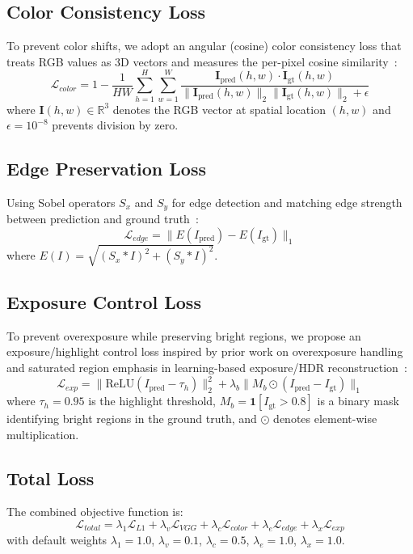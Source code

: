 \documentclass[conference]{IEEEtran}
\begin{document}
\subsection{Color Consistency Loss}
To prevent color shifts, we adopt an angular (cosine) color consistency loss that treats RGB values as 3D vectors and measures the per-pixel cosine similarity~\cite{park2023dualcolor}:
\begin{equation}
\mathcal{L}_{color} = 1 - \frac{1}{HW}\sum_{h=1}^{H}\sum_{w=1}^{W} 
\frac{\mathbf{I}_{\text{pred}}(h,w) \cdot \mathbf{I}_{\text{gt}}(h,w)}
{\|\mathbf{I}_{\text{pred}}(h,w)\|_2 \|\mathbf{I}_{\text{gt}}(h,w)\|_2 + \epsilon}
\end{equation}
where $\mathbf{I}(h,w) \in \mathbb{R}^3$ denotes the RGB vector at spatial 
location $(h,w)$ and $\epsilon=10^{-8}$ prevents division by zero.

\subsection{Edge Preservation Loss}
Using Sobel operators $S_x$ and $S_y$ for edge detection and matching edge strength between prediction and ground truth~\cite{edrnet2025edgematching}:
\begin{equation}
\mathcal{L}_{edge} = \|E(I_{\text{pred}}) - E(I_{\text{gt}})\|_1
\end{equation}
where $E(I) = \sqrt{(S_x * I)^2 + (S_y * I)^2}$.

\subsection{Exposure Control Loss}
To prevent overexposure while preserving bright regions, we propose an exposure/highlight control loss inspired by prior work on overexposure handling and saturated region emphasis in learning-based exposure/HDR reconstruction~\cite{rlunet2024overexposure,afifi2021exposurecorrection,lee2022hsvnet,eilertsen2017singlehdr}:
\begin{equation}
\mathcal{L}_{exp} = \|\text{ReLU}(I_{\text{pred}} - \tau_h)\|_2^2 + 
\lambda_b \|M_b \odot (I_{\text{pred}} - I_{\text{gt}})\|_1
\end{equation}
where $\tau_h = 0.95$ is the highlight threshold, 
$M_b = \mathbf{1}[I_{\text{gt}} > 0.8]$ is a binary mask identifying 
bright regions in the ground truth, and $\odot$ denotes element-wise multiplication.

\subsection{Total Loss}
The combined objective function is:
\begin{equation}
\mathcal{L}_{total} = \lambda_1 \mathcal{L}_{L1} + \lambda_v \mathcal{L}_{VGG} + \lambda_c \mathcal{L}_{color} + \lambda_e \mathcal{L}_{edge} + \lambda_x \mathcal{L}_{exp}
\end{equation}
with default weights $\lambda_1 = 1.0$, $\lambda_v = 0.1$, $\lambda_c = 0.5$, $\lambda_e = 1.0$, $\lambda_x = 1.0$.
\end{document}
